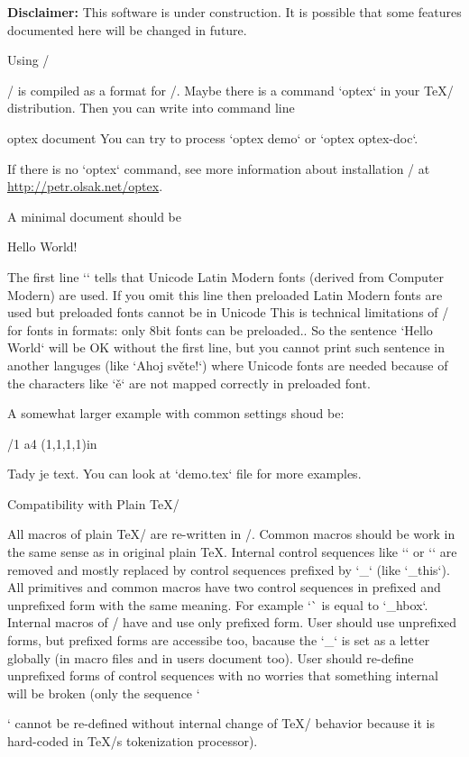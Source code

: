 \new
{\bf Disclaimer:} This software is under construction.
It is possible that some features documented here will be changed in future.


\sec Using \OpTeX/

\new
\OpTeX/ is compiled as a format for \LuaTeX/. Maybe there is a command
`optex` in your \TeX/ distribution. Then you can write into command line

\begtt
optex document
\endtt
%
You can try to process `optex demo` or `optex optex-doc`.

If there is no `optex` command, see more information about installation
\OpTeX/ at \url{http://petr.olsak.net/optex}. 

A minimal document should be

\begtt
\fontfam[LMfonts]
Hello World! \bye
\endtt

The first line `\fontfam[LMfonts]` tells that Unicode Latin Modern 
fonts (derived from Computer Modern) are used. If you omit this line then
preloaded Latin Modern fonts are used but preloaded fonts cannot be in
Unicode\fnote
{This is technical limitations of \LuaTeX/ for fonts in formats:
only 8bit fonts can be preloaded.}.
So the sentence `Hello World` will be OK without the first line, but you 
cannot print such sentence in another languges (like `Ahoj světe!`) 
where Unicode fonts are needed
because of the characters like `ě` are not mapped correctly in preloaded
font.

A somewhat larger example with common settings shoud be:

\begtt
\fontfam[Termes]   %
\typosize[11/13]   %
\margins/1 a4 (1,1,1,1)in   %
\cslang            %

Tady je text.
\bye
\endtt
%
You can look at `demo.tex` file for more examples.


\sec Compatibility with Plain \TeX/

All macros of plain \TeX/ are re-written in \OpTeX/. Common macros should be
work in the same sense as in original plain \TeX. Internal control sequences
\new 
like `\p@` or `\f@@t` are removed and mostly replaced by control sequences
prefixed by `_` (like `\_this`). All primitives and common macros have two
control sequences in prefixed and unprefixed form with the same
meaning. For example `\hbox` is equal to `\_hbox`. 
Internal macros of \OpTeX/ have and use only prefixed form. User should use
unprefixed forms, but prefixed forms are accessibe too, bacause the `_` is
set as a letter globally (in macro files and in users document too). User
should re-define unprefixed forms of control sequences with no worries that
something internal will be broken (only the sequence `\par` cannot be
re-defined without internal change of \TeX/ behavior because it is
hard-coded in \TeX/s tokenization processor).


